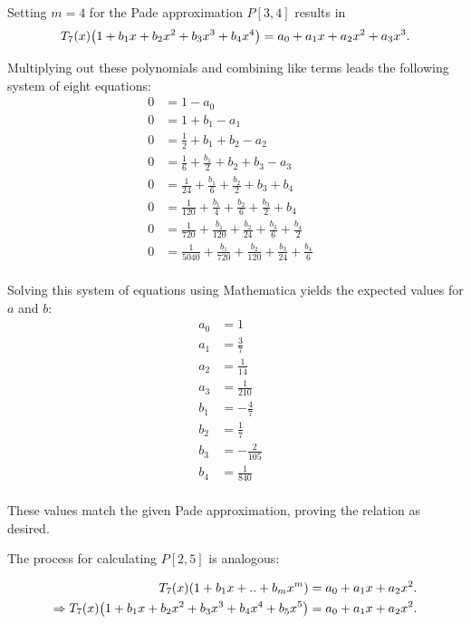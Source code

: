 \documentclass[12pt]{article}
\DeclarePairedDelimiter\rb{(}{)}
\begin{document}
Setting \(m = 4\) for the Pade approximation \(P[3,4]\) results in 
\begin{align*}
	T_{7}\rb*{x} \rb*{ 1 + b_{1}x + b_{2}x^{2} + b_{3}x^{3} + b_{4}x^{4}} 
	= a_{0} + a_{1}x + a_{2}x^{2} + a_{3}x^{3}.
\end{align*}

Multiplying out these polynomials and combining like terms leads the following system of eight equations:
\begin{align*}
	0 & =  1 - a_{0} &\\
	0 & = 1 + b_{1} - a_{1} &\\
	0 & =  \frac{1}{2} + b_{1} + b_{2} - a_{2} &\\
	0 & =  \frac{1}{6} + \frac{b_{1}}{2} + b_{2} + b_{3} - a_{3} &\\
	0 & =  \frac{1}{24} + \frac{b_{1}}{6} + \frac{b_{2}}{2} + b_{3} + b_{4} &\\
	0 & =  \frac{1}{120} + \frac{b_{1}}{4} + \frac{b_{2}}{6} + \frac{b_{3}}{2} + b_{4} &\\
	0 & =  \frac{1}{720} + \frac{b_{1}}{120} + \frac{b_{2}}{24} + \frac{b_{3}}{6} + \frac{b_{4}}{2} &\\
	0 & =  \frac{1}{5040} + \frac{b_{1}}{720} + \frac{b_{2}}{120} + \frac{b_{3}}{24} + \frac{b_{4}}{6} &\\
\end{align*}

Solving this system of equations using Mathematica yields the expected values for \(a\) and \(b\):
\begin{align*}
	a_{0} & =  1 &\\
	a_{1} & =  \frac{3}{7} &\\
	a_{2} & =  \frac{1}{14} &\\
	a_{3} & =  \frac{1}{210} &\\
	b_{1} & =  - \frac{4}{7} &\\
	b_{2} & =  \frac{1}{7} &\\
	b_{3} & =  - \frac{2}{105} &\\
	b_{4} & =  \frac{1}{840} &\\
\end{align*}

These values match the given Pade approximation, proving the relation as desired. 

The process for calculating \(P[2,5]\) is analogous:


\begin{align*}
	T_{7}\rb*{x}\rb*{ 1 + b_{1}x + .. + b_{m}x^{m}} 
	= a_{0} + a_{1}x + a_{2}x^{2}. &\\
	\Rightarrow 
	T_{7}\rb*{x}\rb*{ 1 + b_{1}x + b_{2} x^{2} + b_{3} x^{3} + b_{4} x^{4} + b_{5} x^{5}}  
	= a_{0} + a_{1}x + a_{2}x^{2}.
\end{align*}
\end{document}
